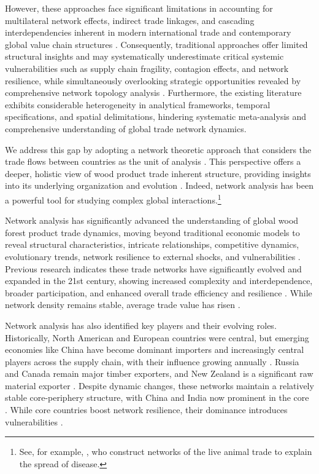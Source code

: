 \documentclass[
  authoryear,
  review,
  3p]{elsarticle}
\begin{document}
However, these approaches face significant limitations in accounting for
multilateral network effects, indirect trade linkages, and cascading
interdependencies inherent in modern international trade and
contemporary global value chain structures
\citep{de_benedictis_world_2011, amador_networks_2017, liu_spatial-temporal_2025}.
Consequently, traditional approaches offer limited structural insights
and may systematically underestimate critical systemic vulnerabilities
such as supply chain fragility, contagion effects, and network
resilience, while simultaneously overlooking strategic opportunities
revealed by comprehensive network topology analysis
\citep{fevre_animal_2006, huang_static_2024}. Furthermore, the existing
literature exhibits considerable heterogeneity in analytical frameworks,
temporal specifications, and spatial delimitations, hindering systematic
meta-analysis and comprehensive understanding of global trade network
dynamics.

We address this gap by adopting a network theoretic approach that
considers the trade flows between countries as the unit of analysis
\citep{de_benedictis_world_2011, amador_networks_2017}. This perspective
offers a deeper, holistic view of wood product trade inherent structure,
providing insights into its underlying organization and evolution
\citep{long_exploring_2019, shen_structural_2022}. Indeed, network
analysis has been a powerful tool for studying complex global
interactions.\footnote{See, for example, \citep{fevre_animal_2006}, who
  construct networks of the live animal trade to explain the spread of
  disease.}

Network analysis has significantly advanced the understanding of global
wood forest product trade dynamics, moving beyond traditional economic
models to reveal structural characteristics, intricate relationships,
competitive dynamics, evolutionary trends, network resilience to
external shocks, and vulnerabilities
\citep{lovric_social_2018, long_exploring_2019, gao_trade_2024, huang_static_2024}.
Previous research indicates these trade networks have significantly
evolved and expanded in the 21st century, showing increased complexity
and interdependence, broader participation, and enhanced overall trade
efficiency and resilience
\citep{wang_exploratory_2020, gao_trade_2024, huang_static_2024, liu_analysis_2024}.
While network density remains stable, average trade value has risen
\citep{zhou_spatial_2021}.

Network analysis has also identified key players and their evolving
roles. Historically, North American and European countries were central,
but emerging economies like China have become dominant importers and
increasingly central players across the supply chain, with their
influence growing annually
\citep{zhou_spatial_2021, gao_trade_2024, huang_static_2024, liu_analysis_2024}.
Russia and Canada remain major timber exporters, and New Zealand is a
significant raw material exporter \citep{zhou_spatial_2021}. Despite
dynamic changes, these networks maintain a relatively stable
core-periphery structure, with China and India now prominent in the core
\citep{wang_exploratory_2020}. While core countries boost network
resilience, their dominance introduces vulnerabilities
\citep{huang_static_2024}.
\end{document}
